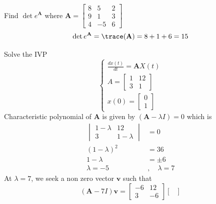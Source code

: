 \begin{example}
    Find $\det e^{\mathbf{A}}$ where
    \(
    \mathbf{A} = \begin{bmatrix}
        8 & 5  & 2 \\
        9 & 1  & 3 \\
        4 & -5 & 6
    \end{bmatrix}
    \)
    \[
        \det e^{\mathbf{A}} = \trace(\mathbf{A}) = 8+1+6 = 15
    \]
\end{example}
\newpage
\begin{example}
    Solve the IVP
    \begin{equation}
        \begin{cases}
            \displaystyle \frac{dx(t)}{dt} = \mathbf{A}X(t)
            \\
            A =
            \begin{bmatrix}
                1 & 12 \\
                3 & 1
            \end{bmatrix}
            \\
            x(0) =
            \begin{bmatrix}
                0 \\
                1
            \end{bmatrix}
        \end{cases}
    \end{equation}
    Characteristic polynomial of $\mathbf{A}$ is given by $(\mathbf{A}-\lambda I) = 0$ which is  
    \begin{align*}
        \begin{vmatrix}
            1-\lambda & 12        \\
            3         & 1-\lambda
        \end{vmatrix}      & = 0
        \\
        (1-\lambda)^2      & = 36
        \\
        1-\lambda          & = \pm 6
        \\
        \lambda = -5 \quad & , \quad \lambda = 7
    \end{align*}
    At $\lambda = 7$, we seek a non zero vector $\mathbf{v}$ such that
    \[
        (\mathbf{A} - 7 I) \mathbf{v} =
        \begin{bmatrix}
            -6 & 12 \\
            3  & -6
        \end{bmatrix}
        \begin{bmatrix}

\end{bmatrix}\]
\end{example}
